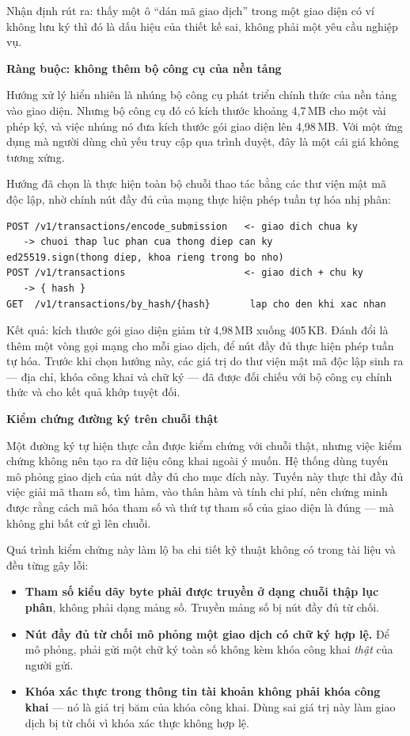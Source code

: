 Nhận định rút ra: thấy một ô {``}dán mã giao dịch{''} trong một giao diện có ví không lưu ký thì đó là dấu hiệu của thiết kế sai, không phải một yêu cầu nghiệp vụ.

\noindent \textbf{Ràng buộc: không thêm bộ công cụ của nền tảng}

Hướng xử lý hiển nhiên là nhúng bộ công cụ phát triển chính thức của nền tảng vào giao diện. Nhưng bộ công cụ đó có kích thước khoảng 4,7\,MB cho một vài phép ký, và việc nhúng nó đưa kích thước gói giao diện lên 4,98\,MB. Với một ứng dụng mà người dùng chủ yếu truy cập qua trình duyệt, đây là một cái giá không tương xứng.

Hướng đã chọn là thực hiện toàn bộ chuỗi thao tác bằng các thư viện mật mã độc lập, nhờ chính nút đầy đủ của mạng thực hiện phép tuần tự hóa nhị phân:

\begin{lstlisting}
POST /v1/transactions/encode_submission   <- giao dich chua ky
   -> chuoi thap luc phan cua thong diep can ky
ed25519.sign(thong diep, khoa rieng trong bo nho)
POST /v1/transactions                     <- giao dich + chu ky
   -> { hash }
GET  /v1/transactions/by_hash/{hash}       lap cho den khi xac nhan
\end{lstlisting}

Kết quả: kích thước gói giao diện giảm từ 4,98\,MB xuống 405\,KB. Đánh đổi là thêm một vòng gọi mạng cho mỗi giao dịch, để nút đầy đủ thực hiện phép tuần tự hóa. Trước khi chọn hướng này, các giá trị do thư viện mật mã độc lập sinh ra --- địa chỉ, khóa công khai và chữ ký --- đã được đối chiếu với bộ công cụ chính thức và cho kết quả khớp tuyệt đối.

\noindent \textbf{Kiểm chứng đường ký trên chuỗi thật}

Một đường ký tự hiện thực cần được kiểm chứng với chuỗi thật, nhưng việc kiểm chứng không nên tạo ra dữ liệu công khai ngoài ý muốn. Hệ thống dùng tuyến mô phỏng giao dịch của nút đầy đủ cho mục đích này. Tuyến này thực thi đầy đủ việc giải mã tham số, tìm hàm, vào thân hàm và tính chi phí, nên chứng minh được rằng cách mã hóa tham số và thứ tự tham số của giao diện là đúng --- mà không ghi bất cứ gì lên chuỗi.

Quá trình kiểm chứng này làm lộ ba chi tiết kỹ thuật không có trong tài liệu và đều từng gây lỗi:

\begin{itemize}
    \item \textbf{Tham số kiểu dãy byte phải được truyền ở dạng chuỗi thập lục phân}, không phải dạng mảng số. Truyền mảng số bị nút đầy đủ từ chối.
    \item \textbf{Nút đầy đủ từ chối mô phỏng một giao dịch có chữ ký hợp lệ.} Để mô phỏng, phải gửi một chữ ký toàn số không kèm khóa công khai \emph{thật} của người gửi.
    \item \textbf{Khóa xác thực trong thông tin tài khoản không phải khóa công khai} --- nó là giá trị băm của khóa công khai. Dùng sai giá trị này làm giao dịch bị từ chối vì khóa xác thực không hợp lệ.
\end{itemize}

